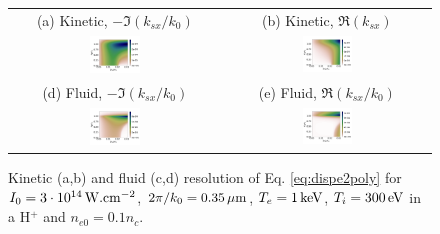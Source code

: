 \documentclass[
 reprint,
 amsmath,amssymb,
 aps,
]{revtex4-1}
\begin{document}
\begin{figure}
\begin{tabular}{cc}
(a) Kinetic, $-\Im(k_{sx}/k_0)$ &
(b)  Kinetic, $\Re(k_{sx})$ \\
\includegraphics[width=0.25\textwidth]{G_Te1keV_Ti300_3e14_3w_1e-1nc_Hp.png}&
\includegraphics[width=0.25\textwidth]{k_Te1keV_Ti300_3e14_3w_1e-1nc_Hp.png}\\
(d) Fluid, $-\Im(k_{sx}/k_0)$  &
(e) Fluid, $\Re(k_{sx}/k_0)$  \\
\includegraphics[width=0.25\textwidth]{Gf_Te1keV_Ti300_3e14_3w_1e-1nc_Hp.png}&
\includegraphics[width=0.25\textwidth]{kf_Te1keV_Ti300_3e14_3w_1e-1nc_Hp.png}
\end{tabular}
\caption{ \label{fig:dispe}  
Kinetic (a,b) and fluid (c,d) resolution of Eq. \eqref{eq:dispe2poly} for  $I_0 = 3\cdot 10^{14}\, \rm W.cm^{-2}$, $2\pi/k_0=0.35 \,\rm\mu m$, $T_e =1\,\rm  keV$, $ T_i=300\,  \rm eV$ in a H$^+$ and $n_{e0}=0.1n_c$.
 }
\end{figure}
\end{document}
